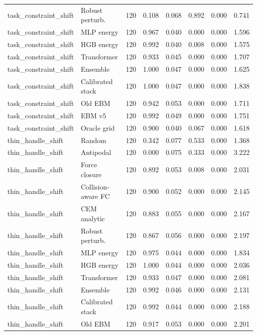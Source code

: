{\begin{longtable}{llrrrrrr}
task\_constraint\_shift & Robust perturb. & 120 & 0.108 & 0.068 & 0.892 & 0.000 & 0.741 \\
task\_constraint\_shift & MLP energy & 120 & 0.967 & 0.040 & 0.000 & 0.000 & 1.596 \\
task\_constraint\_shift & HGB energy & 120 & 0.992 & 0.040 & 0.008 & 0.000 & 1.575 \\
task\_constraint\_shift & Transformer & 120 & 0.933 & 0.045 & 0.000 & 0.000 & 1.707 \\
task\_constraint\_shift & Ensemble & 120 & 1.000 & 0.047 & 0.000 & 0.000 & 1.625 \\
task\_constraint\_shift & Calibrated stack & 120 & 1.000 & 0.047 & 0.000 & 0.000 & 1.838 \\
task\_constraint\_shift & Old EBM & 120 & 0.942 & 0.053 & 0.000 & 0.000 & 1.711 \\
task\_constraint\_shift & EBM v5 & 120 & 0.992 & 0.049 & 0.000 & 0.000 & 1.751 \\
task\_constraint\_shift & Oracle grid & 120 & 0.900 & 0.040 & 0.067 & 0.000 & 1.618 \\
thin\_handle\_shift & Random & 120 & 0.342 & 0.077 & 0.533 & 0.000 & 1.368 \\
thin\_handle\_shift & Antipodal & 120 & 0.000 & 0.075 & 0.333 & 0.000 & 3.222 \\
thin\_handle\_shift & Force closure & 120 & 0.892 & 0.053 & 0.008 & 0.000 & 2.031 \\
thin\_handle\_shift & Collision-aware FC & 120 & 0.900 & 0.052 & 0.000 & 0.000 & 2.145 \\
thin\_handle\_shift & CEM analytic & 120 & 0.883 & 0.055 & 0.000 & 0.000 & 2.167 \\
thin\_handle\_shift & Robust perturb. & 120 & 0.867 & 0.056 & 0.000 & 0.000 & 2.197 \\
thin\_handle\_shift & MLP energy & 120 & 0.975 & 0.044 & 0.000 & 0.000 & 1.834 \\
thin\_handle\_shift & HGB energy & 120 & 1.000 & 0.044 & 0.000 & 0.000 & 2.036 \\
thin\_handle\_shift & Transformer & 120 & 0.933 & 0.047 & 0.000 & 0.000 & 2.081 \\
thin\_handle\_shift & Ensemble & 120 & 0.992 & 0.046 & 0.000 & 0.000 & 2.131 \\
thin\_handle\_shift & Calibrated stack & 120 & 0.992 & 0.044 & 0.000 & 0.000 & 2.188 \\
thin\_handle\_shift & Old EBM & 120 & 0.917 & 0.053 & 0.000 & 0.000 & 2.201 \\

\end{longtable}}
